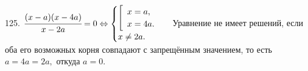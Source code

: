125. $\cfrac{(x-a)(x-4a)}{x-2a}=0\Leftrightarrow \begin{cases} \left[\begin{array}{l} x=a,\\ x=4a.\end{array}\right.\\ x\neq 2a.\end{cases}$ Уравнение не имеет решений, если оба его возможных корня совпадают с запрещённым значением, то есть $a=4a=2a,$ откуда $a=0.$\\
